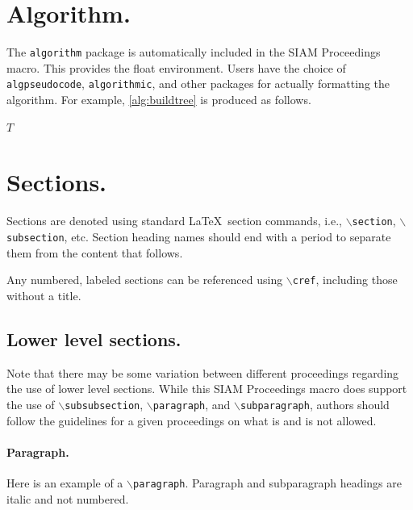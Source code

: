 \documentclass[twoside,leqno]{article}
\begin{document}
\section{Algorithm.}
\label{sec:alg}

The \texttt{algorithm} package is automatically included in the SIAM Proceedings
macro. This provides the float environment. Users have the choice of \texttt{algpseudocode},
\texttt{algorithmic}, and other packages for actually formatting the algorithm.
For example, \cref{alg:buildtree} is produced as follows.

\begin{algorithm}
\caption{Build tree}
\label{alg:buildtree}
\begin{algorithmic}
\ENDWHILE
\RETURN $T$
\end{algorithmic}
\end{algorithm}

\section{Sections.}
\label{sec:sec}
Sections are denoted using standard \LaTeX\ section commands, i.e.,
$\backslash$\texttt{section}, $\backslash$\texttt{subsection}, etc. Section heading names should end with a period to separate them from the content that follows.

Any numbered, labeled sections can be referenced using $\backslash$\texttt{cref},
including those without a title.

\subsection{Lower level sections.}
Note that there may be some variation between different proceedings regarding the use of lower level sections. 
While this SIAM Proceedings macro does support the use of $\backslash$\texttt{subsubsection}, $\backslash$\texttt{paragraph}, 
and $\backslash$\texttt{subparagraph}, authors should follow the guidelines for a given proceedings on what is and is not
allowed.

\paragraph{Paragraph.}
Here is an example of a $\backslash$\texttt{paragraph}. Paragraph and subparagraph headings are italic and not numbered.
\end{document}

